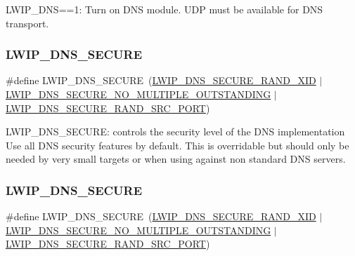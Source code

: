 L\+W\+I\+P\+\_\+\+D\+NS==1\+: Turn on D\+NS module. U\+DP must be available for D\+NS transport. \mbox{\label{group__lwip__opts__dns_ga8979c30dfbfde609d5139f80aabdfcc5}} 
\subsubsection{\texorpdfstring{L\+W\+I\+P\+\_\+\+D\+N\+S\+\_\+\+S\+E\+C\+U\+RE}{LWIP\_DNS\_SECURE}\hspace{0.1cm}{\footnotesize\ttfamily [1/2]}}
{\footnotesize\ttfamily \#define L\+W\+I\+P\+\_\+\+D\+N\+S\+\_\+\+S\+E\+C\+U\+RE~(\hyperlink{group__lwip__opts__dns_ga247795be83258f9afd0e3649a20fe30d}{L\+W\+I\+P\+\_\+\+D\+N\+S\+\_\+\+S\+E\+C\+U\+R\+E\+\_\+\+R\+A\+N\+D\+\_\+\+X\+ID} $\vert$ \hyperlink{group__lwip__opts__dns_ga5cabf5668bb2532408d9dcb8caf56092}{L\+W\+I\+P\+\_\+\+D\+N\+S\+\_\+\+S\+E\+C\+U\+R\+E\+\_\+\+N\+O\+\_\+\+M\+U\+L\+T\+I\+P\+L\+E\+\_\+\+O\+U\+T\+S\+T\+A\+N\+D\+I\+NG} $\vert$ \hyperlink{group__lwip__opts__dns_ga3aa0b17e6093d9e109790b28d6adfa65}{L\+W\+I\+P\+\_\+\+D\+N\+S\+\_\+\+S\+E\+C\+U\+R\+E\+\_\+\+R\+A\+N\+D\+\_\+\+S\+R\+C\+\_\+\+P\+O\+RT})}

L\+W\+I\+P\+\_\+\+D\+N\+S\+\_\+\+S\+E\+C\+U\+RE\+: controls the security level of the D\+NS implementation Use all D\+NS security features by default. This is overridable but should only be needed by very small targets or when using against non standard D\+NS servers. \mbox{\label{group__lwip__opts__dns_ga8979c30dfbfde609d5139f80aabdfcc5}} 
\subsubsection{\texorpdfstring{L\+W\+I\+P\+\_\+\+D\+N\+S\+\_\+\+S\+E\+C\+U\+RE}{LWIP\_DNS\_SECURE}\hspace{0.1cm}{\footnotesize\ttfamily [2/2]}}
{\footnotesize\ttfamily \#define L\+W\+I\+P\+\_\+\+D\+N\+S\+\_\+\+S\+E\+C\+U\+RE~(\hyperlink{group__lwip__opts__dns_ga247795be83258f9afd0e3649a20fe30d}{L\+W\+I\+P\+\_\+\+D\+N\+S\+\_\+\+S\+E\+C\+U\+R\+E\+\_\+\+R\+A\+N\+D\+\_\+\+X\+ID} $\vert$ \hyperlink{group__lwip__opts__dns_ga5cabf5668bb2532408d9dcb8caf56092}{L\+W\+I\+P\+\_\+\+D\+N\+S\+\_\+\+S\+E\+C\+U\+R\+E\+\_\+\+N\+O\+\_\+\+M\+U\+L\+T\+I\+P\+L\+E\+\_\+\+O\+U\+T\+S\+T\+A\+N\+D\+I\+NG} $\vert$ \hyperlink{group__lwip__opts__dns_ga3aa0b17e6093d9e109790b28d6adfa65}{L\+W\+I\+P\+\_\+\+D\+N\+S\+\_\+\+S\+E\+C\+U\+R\+E\+\_\+\+R\+A\+N\+D\+\_\+\+S\+R\+C\+\_\+\+P\+O\+RT})}

